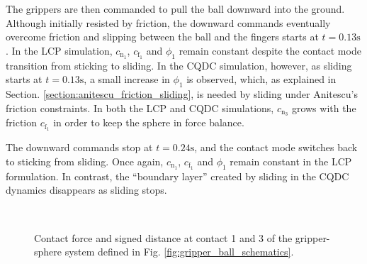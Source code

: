 The grippers are then commanded to pull the ball downward into the ground. Although initially resisted by friction, the downward commands eventually overcome friction and slipping between the ball and the fingers starts at $t = 0.13 \mathrm{s}$. In the LCP simulation, $c_{\mathrm{n}_1}$, $c_{\mathrm{f}_1}$ and $\phi_1$ remain constant despite the contact mode transition from sticking to sliding. In the CQDC simulation, however, as sliding starts at $t = 0.13 \mathrm{s}$, a small increase in $\phi_1$ is observed, which, as explained in Section. \ref{section:anitescu_friction_sliding}, is needed by sliding under Anitescu's friction constraints. In both the LCP and CQDC simulations, $c_{\mathrm{n}_3}$ grows with the friction $c_{\mathrm{f}_1}$ in order to keep the sphere in force balance.

The downward commands stop at $t = 0.24 \mathrm{s}$, and the contact mode switches back to sticking from sliding. Once again, $c_{\mathrm{n}_1}$, $c_{\mathrm{f}_1}$ and $\phi_1$ remain constant in the LCP formulation. In contrast, the ``boundary layer'' created by sliding in the CQDC dynamics disappears as sliding stops.

\begin{figure}
\centering
{}\\
\caption{Contact force and signed distance at contact 1 and 3 of the gripper-sphere system defined in Fig. \ref{fig:gripper_ball_schematics}.}
\label{fig:contact_force_distance}
\end{figure}

